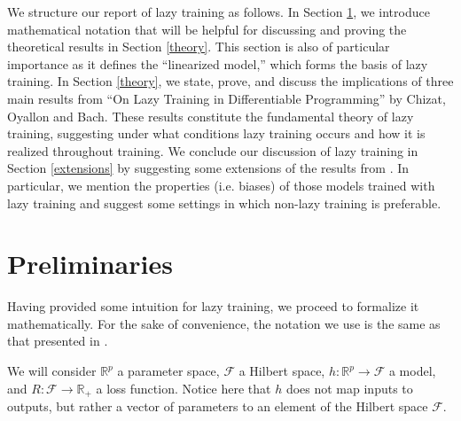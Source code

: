 \documentclass{article}
\begin{document}
We structure our report of lazy training as follows. In Section \ref{prelim}, we introduce mathematical notation that will be helpful for discussing and proving the theoretical results in Section \ref{theory}. This section is also of particular importance as it defines the \enquote{linearized model,} which forms the basis of lazy training. In Section \ref{theory}, we state, prove, and discuss the implications of three main results from \enquote{On Lazy Training in Differentiable Programming} by Chizat, Oyallon and Bach. These results constitute the fundamental theory of lazy training, suggesting under what conditions lazy training occurs and how it is realized throughout training. We conclude our discussion of lazy training in Section \ref{extensions} by suggesting some extensions of the results from \cite{chizat2018lazy}. In particular, we mention the properties (i.e. biases) of those models trained with lazy training and suggest some settings in which non-lazy training is preferable.

\section{Preliminaries}\label{prelim}

Having provided some intuition for lazy training, we proceed to formalize it mathematically. For the sake of convenience, the notation we use is the same as that presented in \cite{chizat2018lazy}.

We will consider $\mathbb{R}^p$ a parameter space, $\mathcal{F}$ a Hilbert space, $h: \mathbb{R}^p \rightarrow \mathcal{F}$ a model, and $R: \mathcal{F} \rightarrow \mathbb{R}_+$ a loss function. Notice here that $h$ does not map inputs to outputs, but rather a vector of parameters to an element of the Hilbert space $\mathcal{F}$.
\end{document}
